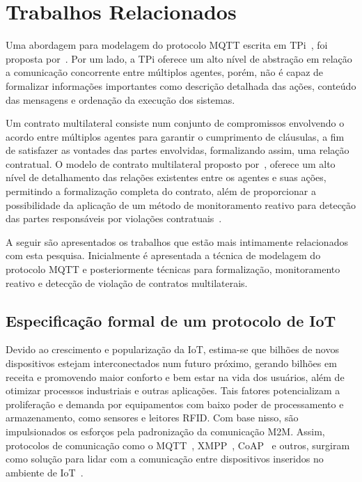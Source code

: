 \chapter{Trabalhos Relacionados}

Uma abordagem para modelagem do protocolo MQTT escrita em TPi~\cite{berger2003two}, foi proposta por~\citeauthor{aziz2016formal}. Por um lado, a TPi oferece um alto nível de abstração em relação a comunicação concorrente entre múltiplos agentes, porém, não é capaz de formalizar informações importantes como descrição detalhada das ações, conteúdo das mensagens e ordenação da execução dos sistemas.

Um contrato multilateral consiste num conjunto de compromissos envolvendo o acordo entre múltiplos agentes para garantir o cumprimento de cláusulas, a fim de satisfazer as vontades das partes envolvidas, formalizando assim, uma relação contratual. O modelo de contrato multilateral proposto por~\citeauthor{xu2004multi}, oferece um alto nível de detalhamento das relações existentes entre os agentes e suas ações, permitindo a formalização completa do contrato, além de proporcionar a possibilidade da aplicação de um método de monitoramento reativo para detecção das partes responsáveis por violações contratuais~\cite{xu2004multi, xu2005detection}.

A seguir são apresentados os trabalhos que estão mais intimamente relacionados com esta pesquisa. Inicialmente é apresentada a técnica de modelagem do protocolo MQTT e posteriormente técnicas para formalização, monitoramento reativo e detecção de violação de contratos multilaterais.  

\section{Especificação formal de um protocolo de IoT} \label{sec:mqtt_model}

Devido ao crescimento e popularização da IoT, estima-se que bilhões de novos dispositivos estejam interconectados num futuro próximo, gerando bilhões em receita e promovendo maior conforto e bem estar na vida dos usuários, além de otimizar processos industriais e outras aplicações. Tais fatores potencializam a proliferação e demanda por equipamentos com baixo poder de processamento e armazenamento, como sensores e leitores RFID. Com base nisso, são impulsionados os esforços pela padronização da comunicação M2M. Assim, protocolos de comunicação como o MQTT~\cite{mqttv3.1.1}, XMPP~\cite{xmpp2011extensible}, CoAP~\cite{shelby2014constrained} e outros, surgiram como solução para lidar com a comunicação entre dispositivos inseridos no ambiente de IoT~\cite{aziz2016formal}.

